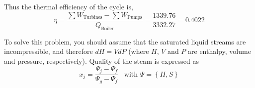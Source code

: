 \documentclass[calculator,steamtables,refrigeranttables,psychrometricchart,datasheet,solutions]{exam}
\newcommand{\frc}{\displaystyle\frac}
\begin{document}
\begin{question}
\begin{enumerate}[(a)]
{Thus the thermal efficiency of the cycle is,~
\begin{displaymath}
\eta = \frc{\sum W_{\text{Turbines}} - \sum W_{\text{Pumps}}}{Q_{\text{Boiler}}} = \frc{1339.76}{3332.27} = 0.4022%
\end{displaymath}

}
%
\end{enumerate}

To solve this problem, you should assume that the saturated liquid streams are incompressible, and therefore $dH = VdP$ (where $H$, $V$ and $P$ are enthalpy, volume and pressure, respectively). Quality of the steam is expressed as
\begin{displaymath}
x_{j} = \frc{\Psi_{j}-\Psi_{f}}{\Psi_{g}-\Psi_{f}}\;\;\;\text{with }\Psi=\left\{H,S\right\}
\end{displaymath}


\end{question}


\clearpage
\end{document}
